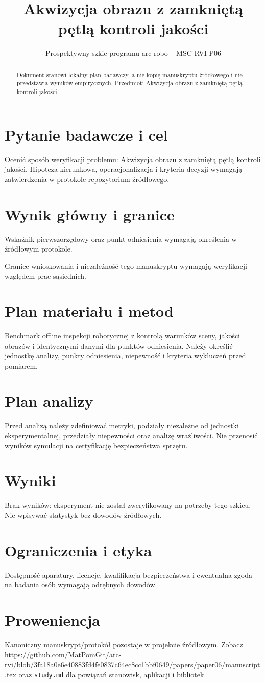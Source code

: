 \documentclass[11pt,a4paper]{article}
\title{Akwizycja obrazu z zamkniętą pętlą kontroli jakości}
\author{}
\date{Prospektywny szkic programu arc-robo -- MSC-RVI-P06}
\begin{document}
\maketitle
\begin{abstract}
Dokument stanowi lokalny plan badawczy, a nie kopię manuskryptu źródłowego i nie przedstawia wyników empirycznych. Przedmiot: Akwizycja obrazu z zamkniętą pętlą kontroli jakości.
\end{abstract}
\section{Pytanie badawcze i cel}
Ocenić sposób weryfikacji problemu: Akwizycja obrazu z zamkniętą pętlą kontroli jakości. Hipoteza kierunkowa, operacjonalizacja i kryteria decyzji wymagają zatwierdzenia w protokole repozytorium źródłowego.
\section{Wynik główny i granice}
Wskaźnik pierwszorzędowy oraz punkt odniesienia wymagają określenia w źródłowym protokole.

Granice wnioskowania i niezależność tego manuskryptu wymagają weryfikacji względem prac sąsiednich.
\section{Plan materiału i metod}
Benchmark offline inspekcji robotycznej z kontrolą warunków sceny, jakości obrazów i identycznymi danymi dla punktów odniesienia. Należy określić jednostkę analizy, punkty odniesienia, niepewność i kryteria wykluczeń przed pomiarem.
\section{Plan analizy}
Przed analizą należy zdefiniować metryki, podziały niezależne od jednostki eksperymentalnej, przedziały niepewności oraz analizę wrażliwości. Nie przenosić wyników symulacji na certyfikację bezpieczeństwa sprzętu.
\section{Wyniki}
Brak wyników: eksperyment nie został zweryfikowany na potrzeby tego szkicu. Nie wpisywać statystyk bez dowodów źródłowych.
\section{Ograniczenia i etyka}
Dostępność aparatury, licencje, kwalifikacja bezpieczeństwa i ewentualna zgoda na badania osób wymagają odrębnych dowodów.
\section{Proweniencja}
Kanoniczny manuskrypt/protokół pozostaje w projekcie źródłowym. Zobacz \url{https://github.com/MatPomGit/arc-rvi/blob/3fa18a0e6e40883fd4fe0837c64ec8cc1bbf0649/papers/paper06/manuscript.tex} oraz \texttt{study.md} dla powiązań stanowisk, aplikacji i bibliotek.
\end{document}

